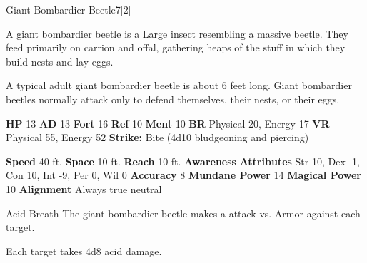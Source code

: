   
  \begin{monsection}{Giant Bombardier Beetle}{7}[2]
    \vspace{-1em}\vspace{-1em}
    \vspace{0em}

    
        A giant bombardier beetle is a Large insect resembling a massive beetle.
        They feed primarily on carrion and offal, gathering heaps of the stuff in which they build nests and lay eggs.
      
        A typical adult giant bombardier beetle is about 6 feet long.
        Giant bombardier beetles normally attack only to defend themselves, their nests, or their eggs.
      

    \begin{spellcontent}
      \begin{spelltargetinginfo}
        \pari \textbf{HP} 13 \monsep
          \textbf{AD} 13 \monsep
          \textbf{Fort} 16 \monsep
          \textbf{Ref} 10 \monsep
          \textbf{Ment} 10
        \pari \textbf{BR} Physical 20, Energy 17 \monsep
        \textbf{VR} Physical 55, Energy 52
        \pari \textbf{Strike:}
            Bite  (4d10 bludgeoning and piercing)
      \end{spelltargetinginfo}
    \end{spellcontent}
    \begin{monsterfooter}
      \pari \textbf{Speed} 40 ft. \monsep
        \textbf{Space} 10 ft. \monsep
        \textbf{Reach} 10 ft.
      \pari \textbf{Awareness} 
      \pari \textbf{Attributes}
        Str 10, Dex -1,
        Con 10, Int -9,
        Per 0, Wil 0
      \pari \textbf{Accuracy} 8 \monsep
        \textbf{Mundane Power} 14 \monsep
      \textbf{Magical Power} 10
      \pari \textbf{Alignment} Always true neutral
    \end{monsterfooter}
  \end{monsection}
  \begin{freeability}{Acid Breath}
       The giant bombardier beetle makes a  attack
        vs. Armor against each target.
    
    \hit Each target takes 4d8 acid damage.
    \end{freeability}
  
